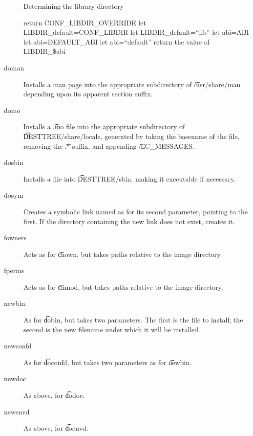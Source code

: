 \begin{description}
\begin{algorithm}
\caption{Determining the library directory} \label{ebuild-libdir}
\begin{algorithmic}[1]
    \STATE return CONF\_LIBDIR\_OVERRIDE
\ENDIF
{}
    \STATE let LIBDIR\_default=CONF\_LIBDIR
\ELSE
    \STATE let LIBDIR\_default=``lib''
\ENDIF
{}
    \STATE let abi=ABI
    \STATE let abi=DEFAULT\_ABI
\ELSE
    \STATE let abi=``default''
\ENDIF
\STATE return the value of LIBDIR\_\$abi
\end{algorithmic}
\end{algorithm}

\item[doman] Installs a man page into the appropriate subdirectory of \t{/usr/share/man} depending
    upon its apparent section suffix.

\item[domo] Installs a \t{.mo} file into the appropriate subdirectory of \t{DESTTREE/share/locale},
    generated by taking the basename of the file, removing the \t{.*} suffix, and appending
    \t{/LC\_MESSAGES}.

\item[dosbin] Installs a file into \t{DESTTREE/sbin}, making it executable if necessary.

\item[dosym] Creates a symbolic link named as for its second parameter, pointing to the first. If
    the directory containing the new link does not exist, creates it.

\item[fowners] Acts as for \t{chown}, but takes paths relative to the image directory.

\item[fperms] Acts as for \t{chmod}, but takes paths relative to the image directory.

\item[newbin] As for \t{dobin}, but takes two parameters. The first is the file to install; the
    second is the new filename under which it will be installed.

\item[newconfd] As for \t{doconfd}, but takes two parameters as for \t{newbin}.

\item[newdoc] As above, for \t{dodoc}.

\item[newenvd] As above, for \t{doenvd}.


\end{description}
